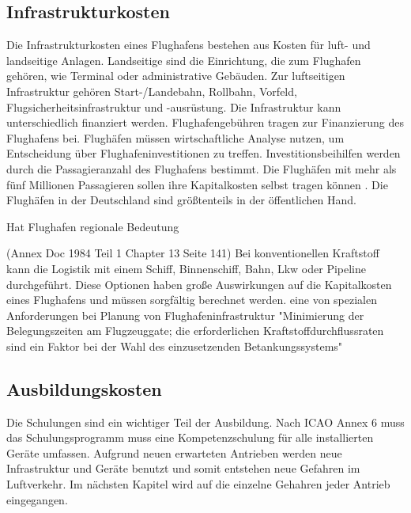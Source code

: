 
\subsection{Infrastrukturkosten}

Die Infrastrukturkosten eines Flughafens bestehen aus Kosten für luft- und landseitige Anlagen. Landseitige sind die Einrichtung, die zum Flughafen
gehören, wie Terminal oder administrative Gebäuden. Zur luftseitigen Infrastruktur gehören Start-/Landebahn, Rollbahn, Vorfeld, 
Flugsicherheitsinfrastruktur und -ausrüstung. Die Infrastruktur kann unterschiedlich finanziert werden.
Flughafengebühren tragen zur Finanzierung des Flughafens bei.
Flughäfen müssen wirtschaftliche Analyse nutzen, um Entscheidung über Flughafeninvestitionen zu treffen. %
Investitionsbeihilfen werden durch die Passagieranzahl des Flughafens bestimmt. Die Flughäfen mit mehr als fünf Millionen Passagieren
sollen ihre Kapitalkosten selbst tragen können \cite{conrady2019luftverkehr}. 
Die Flughäfen in der Deutschland sind größtenteils in der öffentlichen Hand.

Hat Flughafen regionale Bedeutung

(Annex  Doc 1984 Teil 1 Chapter 13 Seite 141)
Bei konventionellen Kraftstoff kann die Logistik mit einem Schiff, Binnenschiff, Bahn, Lkw oder Pipeline durchgeführt. 
Diese Optionen haben große Auswirkungen auf die Kapitalkosten eines Flughafens und müssen sorgfältig berechnet werden. 
eine von spezialen Anforderungen bei Planung von Flughafeninfrastruktur "Minimierung der Belegungszeiten am Flugzeuggate; 
die erforderlichen Kraftstoffdurchflussraten sind ein Faktor bei der Wahl des einzusetzenden Betankungssystems"

\subsection{Ausbildungskosten}

Die Schulungen sind ein wichtiger Teil der Ausbildung. 
Nach ICAO Annex 6 muss das Schulungsprogramm muss eine Kompetenzschulung für alle installierten Geräte umfassen.
Aufgrund neuen erwarteten Antrieben werden neue Infrastruktur und Geräte benutzt und somit entstehen neue Gefahren im Luftverkehr. 
Im nächsten Kapitel wird auf die einzelne Gehahren
jeder Antrieb eingegangen.

